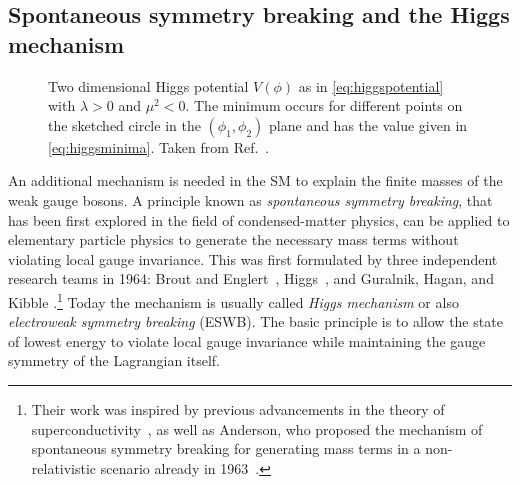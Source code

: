 \subsection{Spontaneous symmetry breaking and the Higgs mechanism}
\label{subsec:ewsymbreaking}





\begin{figure}
  \caption[Two dimensional Higgs potential $V(\phi)$ with $\lambda > 0$ and $\mu^2 < 0$.]{Two dimensional Higgs potential $V(\phi)$ as in \cref{eq:higgspotential} with $\lambda > 0$ and $\mu^2 < 0$. The minimum occurs for different points on the sketched circle in the $(\phi_1, \phi_2)$ plane and has the value given in \cref{eq:higgsminima}. Taken from Ref.~\cite{Halzen:1984mc}.
  }
  \label{fig:higgspotential}
\end{figure}

An additional mechanism is needed in the SM to explain the finite masses of the weak gauge bosons. 
A principle known as \emph{spontaneous symmetry breaking}, that has been first explored in the field of condensed-matter physics, can be applied to elementary particle physics to generate the necessary mass terms without violating local gauge invariance.
This was first formulated by three independent research teams in 1964: Brout and Englert~\cite{PhysRevLett.13.321}, Higgs~\cite{PhysRevLett.13.508,HIGGS1964132}, and Guralnik, Hagan, and Kibble \cite{PhysRevLett.13.585}.\footnote{Their work was inspired by previous advancements in the theory of superconductivity~\cite{PhysRev.108.1175}, as well as Anderson, who proposed the mechanism of spontaneous symmetry breaking for generating mass terms in a non-relativistic scenario already in 1963~\cite{PhysRev.130.439}.}
Today the mechanism is usually called \emph{Higgs mechanism} or also \emph{electroweak symmetry breaking} (ESWB).
The basic principle is to allow the state of lowest energy to violate local gauge invariance while maintaining the gauge symmetry of the Lagrangian itself.

